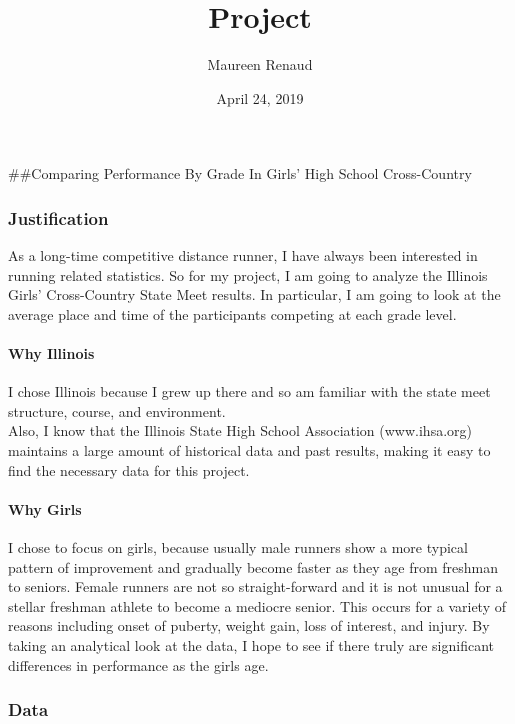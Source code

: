 \documentclass[
]{article}
\title{Project}
\author{Maureen Renaud}
\date{April 24, 2019}
\begin{document}
\maketitle

\#\#Comparing Performance By Grade In Girls' High School Cross-Country

\hypertarget{justification}{%
\subsubsection{Justification}\label{justification}}

As a long-time competitive distance runner, I have always been
interested in running related statistics. So for my project, I am going
to analyze the Illinois Girls' Cross-Country State Meet results. In
particular, I am going to look at the average place and time of the
participants competing at each grade level.

\hypertarget{why-illinois}{%
\paragraph{Why Illinois}\label{why-illinois}}

I chose Illinois because I grew up there and so am familiar with the
state meet structure, course, and environment.\\
Also, I know that the Illinois State High School Association
(www.ihsa.org) maintains a large amount of historical data and past
results, making it easy to find the necessary data for this project.

\hypertarget{why-girls}{%
\paragraph{Why Girls}\label{why-girls}}

I chose to focus on girls, because usually male runners show a more
typical pattern of improvement and gradually become faster as they age
from freshman to seniors. Female runners are not so straight-forward and
it is not unusual for a stellar freshman athlete to become a mediocre
senior. This occurs for a variety of reasons including onset of puberty,
weight gain, loss of interest, and injury. By taking an analytical look
at the data, I hope to see if there truly are significant differences in
performance as the girls age.

\hypertarget{data}{%
\subsubsection{Data}\label{data}}
\end{document}
